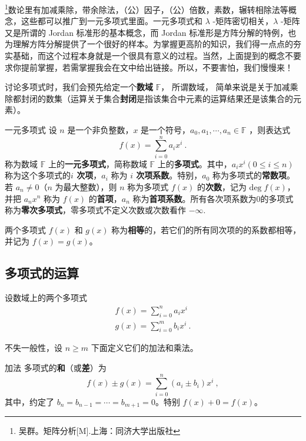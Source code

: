 
\footnote{吴群。矩阵分析[M].上海：同济大学出版社}数论里有加减乘除，带余除法，（公）因子，（公）倍数，素数，辗转相除法等概念，这些都可以推广到一元多项式里面。一元多项式和 $\lambda$ -矩阵密切相关，$\lambda$ -矩阵又是所谓的 Jordan 标准形的基本概念，而 Jordan 标准形是方阵分解的特例，也为理解方阵分解提供了一个很好的样本。为掌握更高阶的知识，我们得一点点的夯实基础，而这个过程本身就是一个很具有意义的过程。当然，上面提到的概念不要求你提前掌握，若需掌握我会在文中给出链接。所以，不要害怕，我们慢慢来！

讨论多项式时，我们会预先给定一个\textbf{数域} $\mathbb{F}$， 所谓数域， 简单来说是关于加减乘除都封闭的数集（运算关于集合\textbf{封闭}是指该集合中元素的运算结果还是该集合的元素）。
\begin{definition}{一元多项式}\label{def_OnePol_1}
设 $n$ 是一个非负整数，$x$ 是一个符号，$a_0,a_1,\cdots,a_n\in \mathbb{F}$ ，则表达式
\begin{equation}
f(x)=\sum_{i=0}^{n}a_i x^i~.
\end{equation}
称为数域 $\mathbb{F}$ 上的\textbf{一元多项式}，简称数域 $\mathbb{F}$ 上的\textbf{多项式}。其中，$a_ix^i(0\leq i\leq n)$ 称为这个多项式的\textbf{$i$ 次项}，$a_i$ 称为 \textbf{$i$ 次项系数}。特别，$a_0$ 称为多项式的\textbf{常数项}。若 $a_n\neq 0$（$n$ 为最大整数），则 $n$ 称为多项式 $f(x)$ 的\textbf{次数}，记为 $\mathrm{deg}\;f(x)$，并把 $a_nx^n$ 称为 $f(x)$ 的\textbf{首项}，$a_n$ 称为\textbf{首项系数}。所有各次项系数为0的多项式称为\textbf{零次多项式}，零多项式不定义次数或次数看作 $-\infty$.
\end{definition}
两个多项式 $f(x)$ 和 $g(x)$ 称为\textbf{相等}的，若它们的所有同次项的的系数都相等，并记为 $f(x)=g(x)$。
\subsection{多项式的运算}
设数域上的两个多项式
\begin{equation}
\begin{aligned}
f(x)=\sum_{i=0}^{n}a_ix^i\\
g(x)=\sum_{i=0}^{m}b_ix^i~.
\end{aligned}
\end{equation}

不失一般性，设 $n\geq m$
下面定义它们的加法和乘法。
\begin{definition}{加法}
多项式的\textbf{和}（或\textbf{差}）为
\begin{equation}
f(x)\pm g(x)=\sum_{i=0}^n (a_i\pm b_i)x^i
\label{eq_OnePol_1}~,
\end{equation}
其中，约定了 $b_n=b_{n-1}=\cdots=b_{m+1}=0$。特别 $f(x)+0=f(x)$。
\end{definition}

